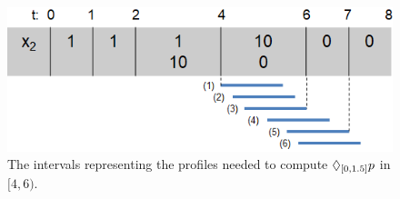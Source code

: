\begin{figure}
	\centering
	\includegraphics[scale=0.45]{profiles.png}
	\caption{The intervals representing the profiles needed to compute $\lozenge_{[0,1.5]} p$ in $[4,6)$. \label{fig:profiles}}
\end{figure}